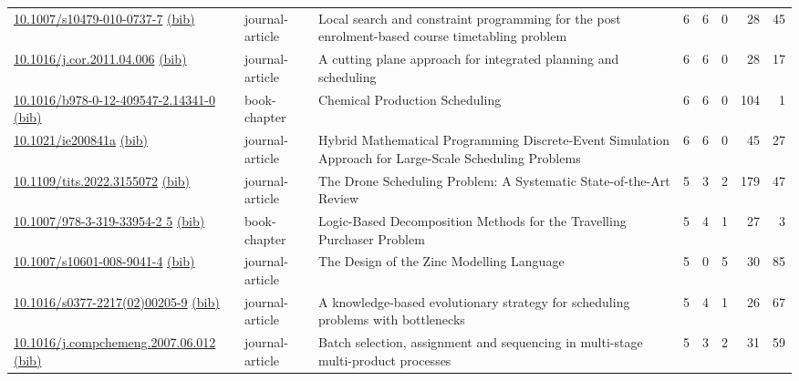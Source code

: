{\begin{longtable}{p{5cm}lp{11cm}rrrrr}
\href{http://dx.doi.org/10.1007/s10479-010-0737-7}{10.1007/s10479-010-0737-7} \href{https://www.doi2bib.org/bib/10.1007/s10479-010-0737-7}{(bib)} & journal-article & Local search and constraint programming for the post enrolment-based course timetabling problem & 6 & 6 & 0 & 28 & 45 \\
\href{http://dx.doi.org/10.1016/j.cor.2011.04.006}{10.1016/j.cor.2011.04.006} \href{https://www.doi2bib.org/bib/10.1016/j.cor.2011.04.006}{(bib)} & journal-article & A cutting plane approach for integrated planning and scheduling & 6 & 6 & 0 & 28 & 17 \\
\href{http://dx.doi.org/10.1016/b978-0-12-409547-2.14341-0}{10.1016/b978-0-12-409547-2.14341-0} \href{https://www.doi2bib.org/bib/10.1016/b978-0-12-409547-2.14341-0}{(bib)} & book-chapter & Chemical Production Scheduling & 6 & 6 & 0 & 104 & 1 \\
\href{http://dx.doi.org/10.1021/ie200841a}{10.1021/ie200841a} \href{https://www.doi2bib.org/bib/10.1021/ie200841a}{(bib)} & journal-article & Hybrid Mathematical Programming Discrete-Event Simulation Approach for Large-Scale Scheduling Problems & 6 & 6 & 0 & 45 & 27 \\
\href{http://dx.doi.org/10.1109/tits.2022.3155072}{10.1109/tits.2022.3155072} \href{https://www.doi2bib.org/bib/10.1109/tits.2022.3155072}{(bib)} & journal-article & The Drone Scheduling Problem: A Systematic State-of-the-Art Review & 5 & 3 & 2 & 179 & 47 \\
\href{http://dx.doi.org/10.1007/978-3-319-33954-2_5}{10.1007/978-3-319-33954-2 5} \href{https://www.doi2bib.org/bib/10.1007/978-3-319-33954-2_5}{(bib)} & book-chapter & Logic-Based Decomposition Methods for the Travelling Purchaser Problem & 5 & 4 & 1 & 27 & 3 \\
\href{http://dx.doi.org/10.1007/s10601-008-9041-4}{10.1007/s10601-008-9041-4} \href{https://www.doi2bib.org/bib/10.1007/s10601-008-9041-4}{(bib)} & journal-article & The Design of the Zinc Modelling Language & 5 & 0 & 5 & 30 & 85 \\
\href{http://dx.doi.org/10.1016/s0377-2217(02)00205-9}{10.1016/s0377-2217(02)00205-9} \href{https://www.doi2bib.org/bib/10.1016/s0377-2217(02)00205-9}{(bib)} & journal-article & A knowledge-based evolutionary strategy for scheduling problems with bottlenecks & 5 & 4 & 1 & 26 & 67 \\
\href{http://dx.doi.org/10.1016/j.compchemeng.2007.06.012}{10.1016/j.compchemeng.2007.06.012} \href{https://www.doi2bib.org/bib/10.1016/j.compchemeng.2007.06.012}{(bib)} & journal-article & Batch selection, assignment and sequencing in multi-stage multi-product processes & 5 & 3 & 2 & 31 & 59 \\

\end{longtable}}
